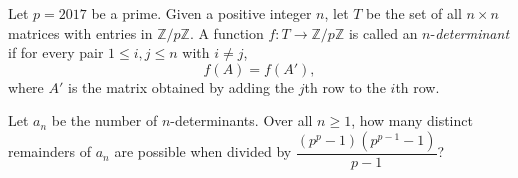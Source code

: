 Let $p = 2017$ be a prime. Given a positive integer $n$, let $T$ be the set of all $n\times n$ matrices with entries in $\mathbb{Z}/p\mathbb{Z}$. A function $f:T\rightarrow \mathbb{Z}/p\mathbb{Z}$ is called an $n$-\emph{determinant} if for every pair $1\le i, j\le n$ with $i\not= j$, \[f(A) = f(A'),\] where $A'$ is the matrix obtained by adding the $j$th row to the $i$th row.

Let $a_n$ be the number of $n$-determinants. Over all $n\ge 1$, how many distinct remainders of $a_n$ are possible when divided by $\dfrac{(p^p - 1)(p^{p - 1} - 1)}{p - 1}$?
